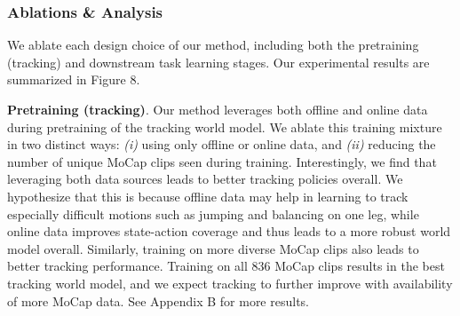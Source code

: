 \documentclass[sn-mathphys-num]{sn-jnl}%
\theoremstyle{thmstyleone}	%
\theoremstyle{thmstyletwo}	%
\theoremstyle{thmstylethree}	%
\begin{document}
\subsubsection{Ablations \& Analysis}

We ablate each design choice of our method, including both the pretraining (tracking) and downstream task learning stages.
Our experimental results are summarized in Figure 8.

\textbf{Pretraining (tracking)}.
Our method leverages both offline and online data during pretraining of the tracking world model.
We ablate this training mixture in two distinct ways:
\textit{(i)} using only offline or online data,
and \textit{(ii)} reducing the number of unique MoCap clips seen during training.
Interestingly, we find that leveraging both data sources leads to better tracking policies overall.
We hypothesize that this is because offline data may help in learning to track especially difficult motions such as jumping and balancing on one leg,
while online data improves state-action coverage and thus leads to a more robust world model overall.
Similarly, training on more diverse MoCap clips also leads to better tracking performance.
Training on all 836 MoCap clips results in the best tracking world model,
and we expect tracking to further improve with availability of more MoCap data.
See Appendix B for more results.
\end{document}
